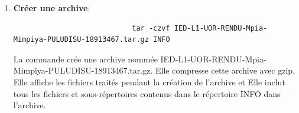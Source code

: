 \documentclass[a4paper,11pt]{article}
\begin{document}
            \begin{enumerate}
                \item \textbf{Créer une archive}:
                    \begin{tcolorbox}[colback=lightgray!6, colframe=black, left=-50mm, right=5mm, top=2mm, bottom=-2mm, boxrule=0.1mm]
                        \begin{verbatim}
                            tar -czvf IED-L1-UOR-RENDU-Mpia-Mimpiya-PULUDISU-18913467.tar.gz INFO
                        \end{verbatim}
                    \end{tcolorbox}

                    \noindent La commande crée une archive nommée IED-L1-UOR-RENDU-Mpia-Mimpiya-PULUDISU-18913467.tar.gz. Elle compresse cette archive avec gzip.
                    Elle affiche les fichiers traités pendant la création de l'archive et Elle inclut tous les fichiers et sous-répertoires contenus dans le répertoire INFO dans l'archive.
                    

\end{enumerate}
\end{document}
